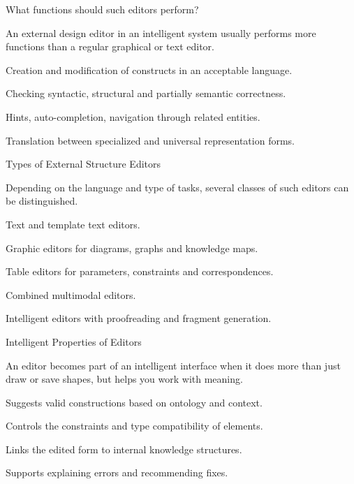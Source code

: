 \begin{frame}{What functions should such editors perform?}
	\topline
	\justifying
	
	An external design editor in an intelligent system usually performs more functions than a regular graphical or text editor.
	
	\begin{textitemize}
		\item Creation and modification of constructs in an acceptable language.
		\item Checking syntactic, structural and partially semantic correctness.
		\item Hints, auto-completion, navigation through related entities.
		\item Translation between specialized and universal representation forms.
	\end{textitemize}
\end{frame}

\begin{frame}{Types of External Structure Editors}
	\topline
	\justifying
	
	Depending on the language and type of tasks, several classes of such editors can be distinguished.
	
	\begin{textitemize}
		\item Text and template text editors.
		\item Graphic editors for diagrams, graphs and knowledge maps.
		\item Table editors for parameters, constraints and correspondences.
		\item Combined multimodal editors.
		\item Intelligent editors with proofreading and fragment generation.
	\end{textitemize}
\end{frame}

\begin{frame}{Intelligent Properties of Editors}
	\topline
	\justifying
	
	An editor becomes part of an intelligent interface when it does more than just draw or save shapes, but helps you work with meaning.
	
	\begin{textitemize}
		\item Suggests valid constructions based on ontology and context.
		\item Controls the constraints and type compatibility of elements.
		\item Links the edited form to internal knowledge structures.
		\item Supports explaining errors and recommending fixes.
	\end{textitemize}
\end{frame}

